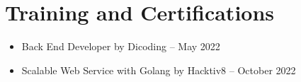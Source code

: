 \section*{Training and Certifications}

\begin{itemize}
	\item Back End Developer by Dicoding -- May 2022
	\item Scalable Web Service with Golang by Hacktiv8 -- October 2022
\end{itemize}
